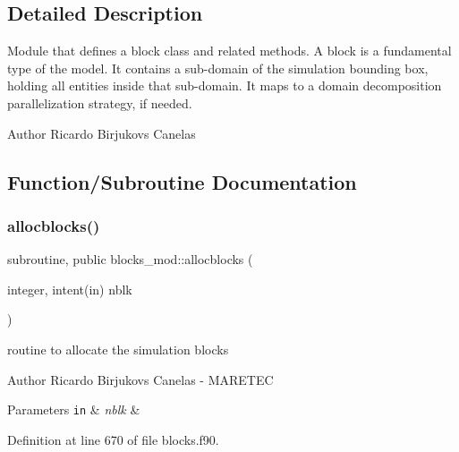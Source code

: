 \subsection{Detailed Description}
Module that defines a block class and related methods. A block is a fundamental type of the model. It contains a sub-\/domain of the simulation bounding box, holding all entities inside that sub-\/domain. It maps to a domain decomposition parallelization strategy, if needed. 

\begin{DoxyAuthor}{Author}
Ricardo Birjukovs Canelas 
\end{DoxyAuthor}


\subsection{Function/\+Subroutine Documentation}
\mbox{\label{namespaceblocks__mod_a639beb0fee2290d46353f4b4702d6711}} 
\subsubsection{\texorpdfstring{allocblocks()}{allocblocks()}}
{\footnotesize\ttfamily subroutine, public blocks\+\_\+mod\+::allocblocks (\begin{DoxyParamCaption}\item[{integer, intent(in)}]{nblk }\end{DoxyParamCaption})}



routine to allocate the simulation blocks 

\begin{DoxyAuthor}{Author}
Ricardo Birjukovs Canelas -\/ M\+A\+R\+E\+T\+EC 
\end{DoxyAuthor}

\begin{DoxyParams}[1]{Parameters}
\mbox{\tt in}  & {\em nblk} & \\
\hline
\end{DoxyParams}


Definition at line 670 of file blocks.\+f90.


